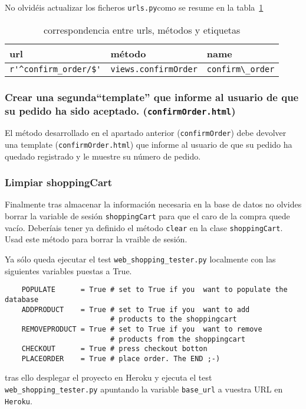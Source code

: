 \documentclass[12pt]{article} %
\newcommand{\ttt}[1]{\texttt{#1}}%
\newcommand{\hhh}[1]{\texttt{#1}}%
\newcommand{\urls}{\texttt{urls.py}}%
\newcommand{\heroku}{\texttt{Heroku}}
\begin{document}
No olvidéis actualizar los ficheros \urls como se resume en la tabla~\ref{tab:urlsconfirmorder}

\begin{table}[H]
\centering
\begin{tabular}{lll}
    \textbf{url} & \textbf{método} & \textbf{name} \\ \hline
 \verb|r'^confirm_order/$'|  & \verb|views.confirmOrder|  & \verb|confirm\_order|\\
\end{tabular}
\caption{correspondencia entre urls, métodos y etiquetas}
\label{tab:urlsconfirmorder}
\end{table}

\subsubsection{Crear una segunda``template'' que informe al usuario de que su pedido ha sido aceptado. (\hhh{confirmOrder.html})}
El método desarrollado en el apartado anterior (\ttt{confirmOrder}) debe devolver una 
template (\hhh{confirmOrder.html}) que  informe al usuario de que su pedido ha quedado registrado y le muestre su número de pedido. 

\subsubsection{Limpiar shoppingCart}
Finalmente tras almacenar la información necesaria en la base de datos no olvides borrar la variable de sesión \ttt{shoppingCart} para que el caro de la compra quede vacío. Deberíais tener ya definido el método \ttt{clear} en la clase \ttt{shoppingCart}. Usad este método para borrar la vraible de sesión.

Ya sólo queda ejecutar el test \ttt{web\_shopping\_tester.py} localmente con las siguientes variables puestas a True.

\begin{verbatim}
    POPULATE      = True # set to True if you  want to populate the database
    ADDPRODUCT    = True # set to True if you  want to add
                         # products to the shoppingcart
    REMOVEPRODUCT = True # set to True if you  want to remove
                         # products from the shoppingcart
    CHECKOUT      = True # press checkout botton
    PLACEORDER    = True # place order. The END ;-)
\end{verbatim}
tras ello desplegar el proyecto en Heroku y ejecuta el test \ttt{web\_shopping\_tester.py}
apuntando la variable \ttt{base\_url} a vuestra URL en \heroku.
\end{document}
